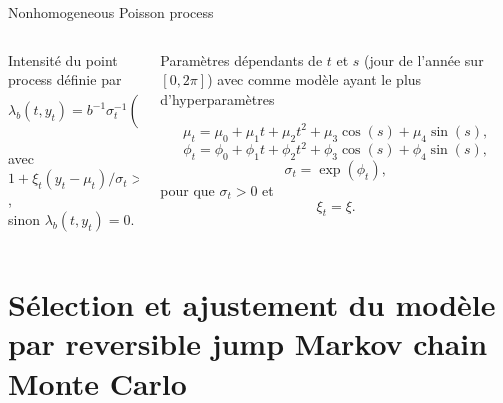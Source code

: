 \documentclass[aspectratio=169]{beamer}
\begin{document}
\begin{frame}{Nonhomogeneous Poisson process}
\begin{columns}
	\begin{column}{0.5\textwidth}
		Intensité du point process définie par
		\vspace{0.1cm} \\
		\begin{equation*}
		\lambda_b(t,y_t) = b^{-1}\sigma_t^{-1} \left( 1+\xi_t\dfrac{y_t-\mu_t}{\sigma_t} \right)^{-1/\xi_t-1}
		\end{equation*}
		\vspace{0.2cm} \\
		avec $1+\xi_t(y_t-\mu_t)/\sigma_t > 0$, \\ sinon $\lambda_b(t,y_t) = 0$.
	\end{column}
	\begin{column}{0.5\textwidth}
		Paramètres dépendants de $t$ et $s$ (jour de l'année sur $[0, 2\pi]$) avec comme modèle ayant le plus d'hyperparamètres
		\begin{fleqn}
		\begin{equation*}
		\mu_t = \mu_0 + \mu_1 t + \mu_2 t^2 + \mu_3 \cos(s) + \mu_4 \sin(s),
		\end{equation*}
		\begin{equation*}
		\phi_t = \phi_0 + \phi_1 t + \phi_2 t^2 + \phi_3 \cos(s) + \phi_4 \sin(s),
		\end{equation*}
		\begin{equation*}
		\sigma_t = \exp(\phi_t),
		\end{equation*}
		pour que $\sigma_t > 0$ et
		\begin{equation*}
		\xi_t = \xi.
		\end{equation*}
		\end{fleqn}
	\end{column}
\end{columns}
	\vspace{0.4cm}
	{\scriptsize
	}
\end{frame}


\section{Sélection et ajustement du modèle par reversible jump Markov chain Monte Carlo}
\end{document}
